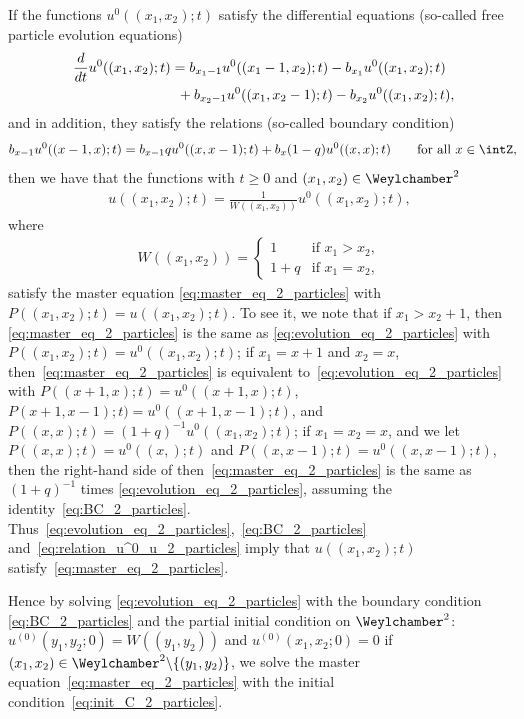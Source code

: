 If the functions $u^0((x_1, x_2); t)$ satisfy the dif\/ferential equations (so-called free particle evolution equations)
\begin{gather}
 \frac{d}{dt} u^0((x_1, x_2); t) = b_{x_1 - 1} u^0((x_1 - 1, x_2); t) - b_{x_1} u^0((x_1, x_2); t) \nonumber\\
 \hphantom{\frac{d}{dt} u^0((x_1, x_2); t) =}{} + b_{x_2 - 1} u^0((x_1, x_2 - 1); t) - b_{x_2} u^0((x_1, x_2); t),\label{eq:evolution_eq_2_particles}
\end{gather}
and in addition, they satisfy the relations (so-called boundary condition)
\begin{gather} \label{eq:BC_2_particles}
 b_{x - 1} u^0((x - 1, x); t) = b_{x - 1} q u^0((x, x - 1); t) + b_x (1 - q) u^0((x, x); t) \qquad \text{for all $x \in \intZ$},\!\!\!
\end{gather}
then we have that the functions with $t \geq 0$ and $(x_1, x_2) \in \Weylchamber^2$
\begin{gather} \label{eq:relation_u^0_u_2_particles}
 u((x_1, x_2); t) = \frac{1}{W((x_1, x_2))} u^0((x_1, x_2); t),
 \end{gather}
where
\begin{gather*}
W((x_1, x_2)) =
 \begin{cases}
 1 & \text{if $x_1 > x_2$}, \\
 1 + q & \text{if $x_1 = x_2$},
 \end{cases}
\end{gather*}
satisfy the master equation \eqref{eq:master_eq_2_particles} with $P((x_1, x_2); t) = u((x_1, x_2); t)$. To see it, we note that if $x_1 > x_2 + 1$, then \eqref{eq:master_eq_2_particles} is the same as \eqref{eq:evolution_eq_2_particles} with $P((x_1, x_2); t) = u^0((x_1, x_2); t)$; if $x_1 = x + 1$ and $x_2 = x$, then~\eqref{eq:master_eq_2_particles} is equivalent to~\eqref{eq:evolution_eq_2_particles} with $P((x + 1, x); t) = u^0((x + 1, x); t)$, $P(x + 1, x - 1); t) = u^0((x + 1, x - 1); t)$, and $P((x, x); t) = (1 + q)^{-1} u^0((x_1, x_2); t)$; if $x_1 = x_2 = x$, and we let $P((x, x); t) = u^0((x, ); t)$ and $P((x, x - 1); t) = u^0((x, x - 1); t)$, then the right-hand side of then~\eqref{eq:master_eq_2_particles} is the same as $(1 + q)^{-1}$ times \eqref{eq:evolution_eq_2_particles}, assuming the identity~\eqref{eq:BC_2_particles}. Thus~\eqref{eq:evolution_eq_2_particles},~\eqref{eq:BC_2_particles} and~\eqref{eq:relation_u^0_u_2_particles} imply that $u((x_1, x_2); t)$ satisfy~\eqref{eq:master_eq_2_particles}.

Hence by solving \eqref{eq:evolution_eq_2_particles} with the boundary condition \eqref{eq:BC_2_particles} and the partial initial condition on $\Weylchamber^2$: $u^{(0)}(y_1, y_2; 0) = W((y_1, y_2))$ and $u^{(0)}(x_1, x_2; 0) = 0$ if $(x_1, x_2) \in \Weylchamber^2 {\setminus} \{ (y_1, y_2) \}$, we solve the master equation~\eqref{eq:master_eq_2_particles} with the initial condition~\eqref{eq:init_C_2_particles}.

